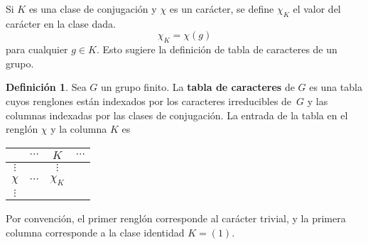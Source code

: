 \documentclass[12pt]{book}
\theoremstyle{definition}
\newtheorem{definition}[theorem]{Definición}
\newcounter{in}
\newcounter{ini}
\begin{document}
Si $K$ es una clase de conjugación y $\chi$ es un carácter, se define
$\chi_{K}$ el valor del carácter en la clase dada.
\begin{equation*}
  \chi_{K}=\chi(g)
\end{equation*}
para cualquier $g\in K$. Esto sugiere la definición de tabla de caracteres de
un grupo. 
\begin{definition}
  Sea $G$ un grupo finito. La \textbf{tabla de caracteres} de $G$ es
  una tabla cuyos renglones están indexados por los caracteres
  irreducibles de~$G$ y las columnas indexadas por las clases de
  conjugación. La entrada de la tabla en el renglón $\chi$ y la columna $K$ es
\end{definition}

\begin{center}
  \begin{tabular}{c |c c c}
    & $\cdots$ & $K$ & $\cdots$\\
    \hline
    $\vdots$ &  & $\vdots$  \\
    $\chi$   & $\cdots$ & $\chi_{K}$  \\
    $\vdots$ &          &   
  \end{tabular}
\end{center}
Por convención, el primer renglón corresponde al carácter trivial, y la
primera columna corresponde a la clase identidad $K=(1)$.
\end{document}
